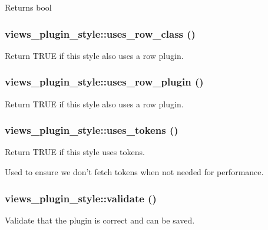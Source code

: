 \begin{DoxyReturn}{Returns}
bool 
\end{DoxyReturn}
\hypertarget{classviews__plugin__style_a2a23b833fd7a5905eba7942c6ccd6d6f}{
\subsubsection[{uses\_\-row\_\-class}]{\setlength{\rightskip}{0pt plus 5cm}views\_\-plugin\_\-style::uses\_\-row\_\-class ()}}
\label{classviews__plugin__style_a2a23b833fd7a5905eba7942c6ccd6d6f}
Return TRUE if this style also uses a row plugin. \hypertarget{classviews__plugin__style_a92ca48fa0359e70572f9a226ac54697f}{
\subsubsection[{uses\_\-row\_\-plugin}]{\setlength{\rightskip}{0pt plus 5cm}views\_\-plugin\_\-style::uses\_\-row\_\-plugin ()}}
\label{classviews__plugin__style_a92ca48fa0359e70572f9a226ac54697f}
Return TRUE if this style also uses a row plugin. \hypertarget{classviews__plugin__style_a7d790501a0aa53283e61cffbd59afb9e}{
\subsubsection[{uses\_\-tokens}]{\setlength{\rightskip}{0pt plus 5cm}views\_\-plugin\_\-style::uses\_\-tokens ()}}
\label{classviews__plugin__style_a7d790501a0aa53283e61cffbd59afb9e}
Return TRUE if this style uses tokens.

Used to ensure we don't fetch tokens when not needed for performance. \hypertarget{classviews__plugin__style_a41929fec27cb0ae7a801276969a080a1}{
\subsubsection[{validate}]{\setlength{\rightskip}{0pt plus 5cm}views\_\-plugin\_\-style::validate ()}}
\label{classviews__plugin__style_a41929fec27cb0ae7a801276969a080a1}
Validate that the plugin is correct and can be saved.

